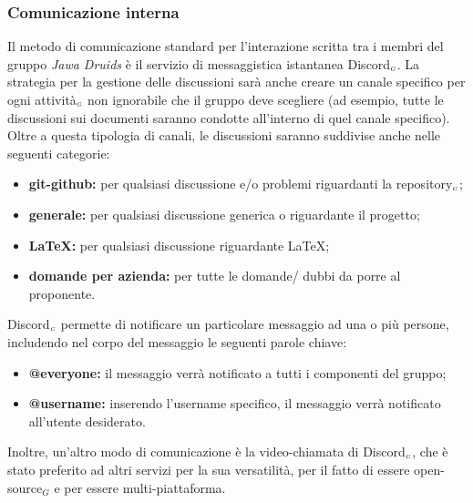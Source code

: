 \subsubsection{Comunicazione interna}\label{ProcessiOrganizzativiProcessoDiCoordinamentoComunicazioneInterna}
Il metodo di comunicazione standard per l'interazione scritta tra i membri del gruppo \textit{Jawa Druids} è il servizio di messaggistica istantanea Discord$_{\scaleto{G}{3pt}}$.
La strategia per la gestione delle discussioni sarà anche creare un canale specifico per ogni attività$_{\scaleto{G}{3pt}}$ non ignorabile che il gruppo deve scegliere (ad esempio, tutte le discussioni sui documenti saranno condotte all'interno di quel canale specifico).
Oltre a questa tipologia di canali, le discussioni saranno suddivise anche nelle seguenti categorie:
\begin{itemize}
\item \textbf{git-github:} per qualsiasi discussione e/o problemi riguardanti la repository$_{\scaleto{G}{3pt}}$;
	\item\textbf{generale:} per qualsiasi discussione generica o riguardante il progetto;
	\item\textbf{\LaTeX:} per qualsiasi discussione riguardante \LaTeX;
	\item\textbf{domande per azienda:} per tutte le domande/ dubbi da porre al proponente.
\end{itemize}
Discord$_{\scaleto{G}{3pt}}$ permette di notificare un particolare messaggio ad una o più persone, includendo nel corpo del messaggio le seguenti parole chiave:
\begin{itemize}
\item \textbf{@everyone:} il messaggio verrà notificato a tutti i componenti del gruppo;
	\item \textbf{@username:} inserendo l'username specifico, il messaggio verrà notificato all'utente desiderato.
\end{itemize}
Inoltre, un'altro modo di comunicazione è la video-chiamata di Discord$_{\scaleto{G}{3pt}}$, che è stato preferito ad altri servizi per la sua versatilità, per il fatto di essere open-source$_G$ e per essere multi-piattaforma.	
